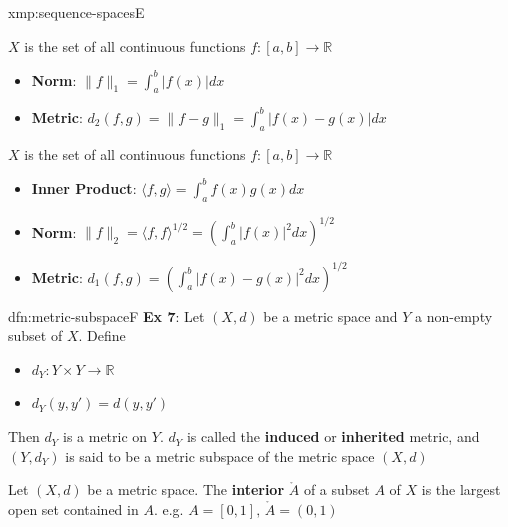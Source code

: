 \documentclass[landscape, 8pt]{extarticle}
\begin{document}
\begin{multicols}{3}
\begin{xmp}{xmp:sequence-spaces}{E}
    \vspace{-3pt}

    $X$ is the set of all continuous functions $f : [a, b] \to \mathbb{R}$
    \vspace{-3pt}
    \begin{itemize}
        \item \textbf{Norm}: $\lVert f \rVert_{1} = \int_{a}^{b} \lvert f(x) \rvert dx$
        \item \textbf{Metric}: $d_{2}(f, g) = \lVert f - g \rVert_{1} = \int_{a}^{b} \lvert f(x) - g(x) \rvert dx$
    \end{itemize}
    \vspace{-3pt}


    $X$ is the set of all continuous functions $f : [a, b] \to \mathbb{R}$
    \vspace{-3pt}
    \begin{itemize}
        \item \textbf{Inner Product}: $\langle f, g \rangle = \int_{a}^{b} f(x)g(x) dx$
        \item \textbf{Norm}: $\lVert f \rVert_{2} = \langle f, f \rangle^{1 /2} = \left(\int_{a}^{b} \lvert f(x) \rvert^{2} dx\right)^{1 /2}$
        \item \textbf{Metric}: $d_{1}(f, g) = \left(\int_{a}^{b} \lvert f(x) - g(x) \rvert^{2} dx\right)^{1 /2}$
    \end{itemize}
\end{xmp}

\begin{dfn}{dfn:metric-subspace}{F}
    \textbf{Ex 7}: Let $(X, d)$ be a metric space and $Y$ a non-empty subset of $X$. Define
    \begin{itemize}
        \item $d_{Y} : Y \times Y \to \mathbb{R}$
        \item $d_{Y}(y, y') = d(y, y')$
    \end{itemize}

    Then $d_{Y}$ is a metric on $Y$. $d_{Y}$ is called the \textbf{induced} or \textbf{inherited} metric, and $(Y, d_{Y})$ is said to be a metric subspace of the metric space $(X, d)$


    Let $(X, d)$ be a metric space. The \textbf{interior} $\mathring{A}$ of a subset $A$ of $X$ is the largest open set contained in $A$. e.g. $A=[0,1],\,\mathring{A}=(0,1)$


\end{dfn}
\end{multicols}
\end{document}
